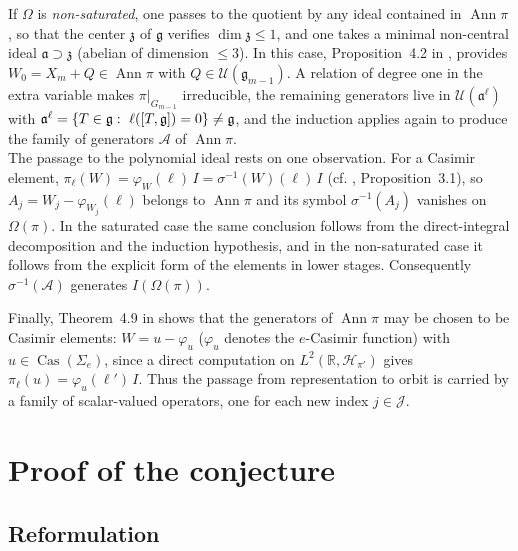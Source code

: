\documentclass[11pt]{amsart}
\theoremstyle{plain}
\theoremstyle{definition}
\theoremstyle{remark}
\newcommand{\g}{\mathfrak g}
\newcommand{\Ann}{\operatorname{Ann}}
\begin{document}
	
	
	If $\Omega$ is \emph{non-saturated}, one passes to the quotient by any ideal contained in $\Ann\pi$, so that the center $\mathfrak z $ of $\mathfrak g$ verifies $\dim\mathfrak z\le1$, and one takes a minimal non-central ideal $\mathfrak a\supset\mathfrak z$ (abelian of dimension $\le3$). In this case, Proposition~4.2 in  \cite{Bak-Fuji-Casimir}, provides $W_0=X_m+Q\in\Ann\pi$ with $Q\in\mathcal U(\g_{m-1})$. A relation of degree one in the extra variable makes $\pi|_{G_{m-1}}$ irreducible, the remaining generators live in $\mathcal U(\mathfrak a^\ell)$ with $\mathfrak a^\ell=\{T\in \frak g:\ \ell([T,\g])=0\}\neq\g$, and the induction applies again to produce the family of generators $\mathscr A$ of $\Ann \pi$.\\
	
	
	
	
	The passage to the polynomial ideal rests on one observation. For a Casimir element, $\pi_\ell(W)=\varphi_W(\ell)\,I=\sigma^{-1}(W)(\ell)\,I$ (cf. \cite{Bak-Fuji-Casimir}, Proposition~3.1), so $A_j=W_j-\varphi_{W_j}(\ell)$ belongs to $\Ann\pi$ and its symbol $\sigma^{-1}(A_j)$ vanishes on $\Omega(\pi)$. In the saturated case the same conclusion follows from the direct-integral decomposition and the induction hypothesis, and in the non-saturated case it follows from the explicit form of the elements in lower stages.   Consequently $\sigma^{-1}(\mathscr A)$ generates $I(\Omega(\pi))$.  
	
	Finally, Theorem~4.9 in \cite{Bak-Fuji-Casimir} shows that the generators of $\Ann \pi$ may be chosen to be Casimir elements: $W=u-\varphi_u$ ($\varphi_u$ denotes the $e$-Casimir function)  with $u\in\operatorname{Cas}(\Sigma_e)$, since a direct computation on $L^2(\mathbb R,\mathcal H_{\pi'})$ gives $\pi_\ell(u)=\varphi_u(\ell')\,I$. Thus the passage from representation to orbit is carried by a family of scalar-valued operators, one for each new index $j\in\mathcal J$.
	

	
	\section{Proof of the conjecture}\label{sect:proof}
	
	\subsection{Reformulation}
	
\end{document}
